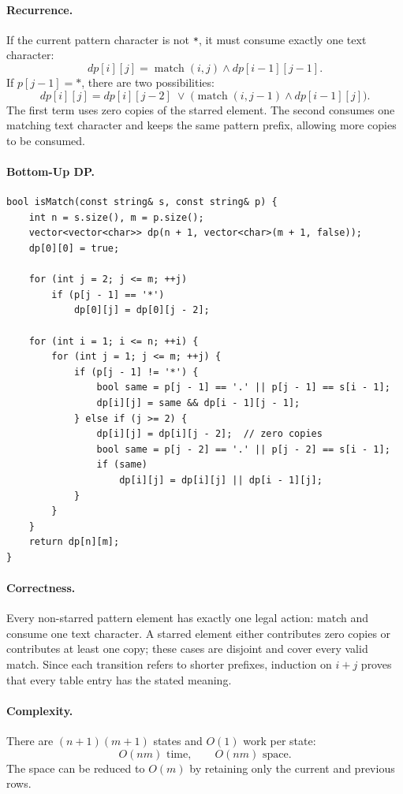\documentclass[9pt]{extarticle}
\begin{document}
\paragraph{Recurrence.}
If the current pattern character is not \texttt{*}, it must consume exactly
one text character:
\[
dp[i][j]
  = \operatorname{match}(i,j) \land dp[i-1][j-1].
\]
If \(p[j-1]=\texttt{*}\), there are two possibilities:
\[
\boxed{
dp[i][j]
  = dp[i][j-2]
    \;\lor\;
    \bigl(\operatorname{match}(i,j-1) \land dp[i-1][j]\bigr).
}
\]
The first term uses zero copies of the starred element. The second consumes
one matching text character and keeps the same pattern prefix, allowing more
copies to be consumed.

\paragraph{Bottom-Up DP.}
\begin{verbatim}
bool isMatch(const string& s, const string& p) {
    int n = s.size(), m = p.size();
    vector<vector<char>> dp(n + 1, vector<char>(m + 1, false));
    dp[0][0] = true;

    for (int j = 2; j <= m; ++j)
        if (p[j - 1] == '*')
            dp[0][j] = dp[0][j - 2];

    for (int i = 1; i <= n; ++i) {
        for (int j = 1; j <= m; ++j) {
            if (p[j - 1] != '*') {
                bool same = p[j - 1] == '.' || p[j - 1] == s[i - 1];
                dp[i][j] = same && dp[i - 1][j - 1];
            } else if (j >= 2) {
                dp[i][j] = dp[i][j - 2];  // zero copies
                bool same = p[j - 2] == '.' || p[j - 2] == s[i - 1];
                if (same)
                    dp[i][j] = dp[i][j] || dp[i - 1][j];
            }
        }
    }
    return dp[n][m];
}
\end{verbatim}

\paragraph{Correctness.}
Every non-starred pattern element has exactly one legal action: match and
consume one text character. A starred element either contributes zero copies
or contributes at least one copy; these cases are disjoint and cover every
valid match. Since each transition refers to shorter prefixes, induction on
\(i+j\) proves that every table entry has the stated meaning.

\paragraph{Complexity.}
There are \((n+1)(m+1)\) states and \(O(1)\) work per state:
\[
O(nm)\text{ time}, \qquad O(nm)\text{ space}.
\]
The space can be reduced to \(O(m)\) by retaining only the current and previous
rows.
\end{document}
